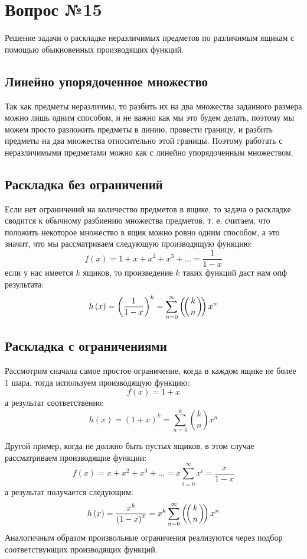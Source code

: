 \chapter{Вопрос №15}

Решение задачи о раскладке неразличимых предметов по различимым ящикам с помощью обыкновенных производящих функций.

\section{Линейно упорядоченное множество}

Так как предметы неразличмы, то разбить их на два множества заданного размера можно лишь одним способом, и не важно как мы это будем делать, поэтому мы можем просто разложить предметы в линию, провести границу, и разбить предметы на два множества относительно этой границы. Поэтому работать с неразличимыми предметами можно как с линейно упорядоченным множеством.

\section{Раскладка без ограничений}

Если нет ограничений на количество предметов в ящике, то задача о раскладке сводится к обычному разбиению множества предметов, т. е. считаем, что положить некоторое множество в ящик можно ровно одним способом, а это значит, что мы рассматриваем следующую производящую функцию:
\[
	f\left(x\right) = 1 + x + x^2 + x^3 + ... = \frac{1}{1 - x}
\]
если у нас имеется $k$ ящиков, то произведение $k$ таких функций даст нам опф результата:
\[
	h\left(x\right) = \left(\frac{1}{1-x}\right)^k = \sum_{n=0}^\infty \left(\negmedspace\left({{k}\atop{n}}\right)\negmedspace\right) x^n
\]

\section{Раскладка с ограничениями}

Рассмотрим сначала самое простое ограничение, когда в каждом ящике не более 1 шара, тогда используем производящую функцию:
\[
	f\left(x\right) = 1+x
\]
а результат соответственно:
\[
	h\left(x\right) = \left(1+x\right)^k = \sum_{n=0}^k \binom{k}{n} x^n
\]

Другой пример, когда не должно быть пустых ящиков, в этом случае рассматриваем производящие функции:
\[
	f\left(x\right) = x + x^2 +x^3 + ... = x\sum_{i=0}^\infty x^i = \frac{x}{1-x}
\]
а результат получается следующим:
\[
	h\left(x\right) = \frac{x^k}{\left(1-x\right)^x} = x^k\sum_{n=0}^\infty \left(\negmedspace\left({{k}\atop{n}}\right)\negmedspace\right)x^n
\]
Аналогичным образом произвольные ограничения реализуются через подбор соответствующих производящих функций.
